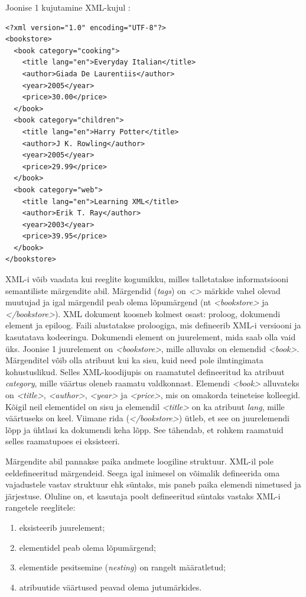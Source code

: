 \documentclass[12pt]{article}
\begin{document}
Joonise 1 kujutamine XML-kujul \citep{XML}:\\


\begin{lstlisting}
<?xml version="1.0" encoding="UTF-8"?>
<bookstore>
  <book category="cooking">
    <title lang="en">Everyday Italian</title>
    <author>Giada De Laurentiis</author>
    <year>2005</year>
    <price>30.00</price>
  </book>
  <book category="children">
    <title lang="en">Harry Potter</title>
    <author>J K. Rowling</author>
    <year>2005</year>
    <price>29.99</price>
  </book>
  <book category="web">
    <title lang="en">Learning XML</title>
    <author>Erik T. Ray</author>
    <year>2003</year>
    <price>39.95</price>
  </book>
</bookstore>
\end{lstlisting}

XML-i võib vaadata kui reeglite kogumikku, milles talletatakse informatsiooni semantiliste märgendite abil. Märgendid (\emph{tags}) on \emph{<>} märkide vahel olevad muutujad ja igal märgendil peab olema lõpumärgend (nt \emph{<bookstore>} ja \emph{</bookstore>}). XML dokument koosneb kolmest osast: proloog, dokumendi element ja epiloog. Faili alustatakse proloogiga, mis defineerib XML-i versiooni ja kasutatava kodeeringu. Dokumendi element on juurelement, mida saab olla vaid üks. Joonise 1 juurelement on \emph{<bookstore>}, mille alluvaks on elemendid \emph{<book>}. Märgenditel võib olla atribuut kui ka sisu, kuid need pole ilmtingimata kohustuslikud. Selles XML-koodijupis on raamatutel defineeritud ka atribuut \emph{category}, mille väärtus oleneb raamatu valdkonnast. Elemendi \emph{<book>} alluvateks on \emph{<title>}, \emph{<author>}, \emph{<year>} ja \emph{<price>}, mis on omakorda teineteise kolleegid. Kõigil neil elementidel on sisu ja elemendil \emph{<title>} on ka atribuut \emph{lang}, mille väärtuseks on keel. Viimane rida (\emph{</bookstore>}) ütleb, et see on juurelemendi lõpp ja ühtlasi ka dokumendi keha lõpp. See tähendab, et rohkem raamatuid selles raamatupoes ei eksisteeri. \citep{XML}

Märgendite abil pannakse paika andmete loogiline struktuur. XML-il pole eeldefineeritud märgendeid. Seega igal inimesel on võimalik defineerida oma vajadustele vastav struktuur ehk süntaks, mis paneb paika elemendi nimetused ja järjestuse. Oluline on, et kasutaja poolt defineeritud süntaks vastaks XML-i rangetele reeglitele:

\begin{enumerate}
    \item eksisteerib juurelement;
    \item elementidel peab olema lõpumärgend;
    \item elementide pesitsemine (\emph{nesting}) on rangelt määratletud;
    \item atribuutide väärtused peavad olema jutumärkides.
    \citep{XML}
\end{enumerate}
\end{document}
